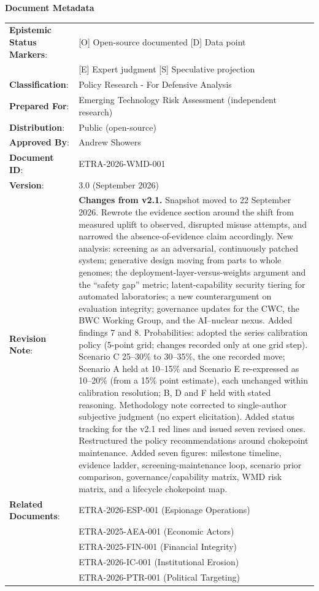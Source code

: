 \documentclass[11pt,letterpaper]{article}
\begin{document}
\vspace{0.1cm}

\begin{center}
\small\textbf{Document Metadata}

\vspace{0.5em}

\footnotesize
\begin{tabular}{ll}
\textbf{Epistemic Status Markers}: & [O] Open-source documented \textbar{} [D] Data point \\
& [E] Expert judgment \textbar{} [S] Speculative projection \\
\textbf{Classification}: & Policy Research - For Defensive Analysis \\
\textbf{Prepared For}: & Emerging Technology Risk Assessment (independent research) \\
\textbf{Distribution}: & Public (open-source) \\
\textbf{Approved By}: & Andrew Showers \\
\textbf{Document ID}: & ETRA-2026-WMD-001 \\
\textbf{Version}: & 3.0 (September 2026) \\
\textbf{Revision Note}: & \parbox[t]{11cm}{\raggedright \textbf{Changes from v2.1.} Snapshot moved to 22 September 2026. Rewrote the evidence section around the shift from measured uplift to observed, disrupted misuse attempts, and narrowed the absence-of-evidence claim accordingly. New analysis: screening as an adversarial, continuously patched system; generative design moving from parts to whole genomes; the deployment-layer-versus-weights argument and the ``safety gap'' metric; latent-capability security tiering for automated laboratories; a new counterargument on evaluation integrity; governance updates for the CWC, the BWC Working Group, and the AI--nuclear nexus. Added findings 7 and 8. Probabilities: adopted the series calibration policy (5-point grid; changes recorded only at one grid step). Scenario C 25--30\% to 30--35\%, the one recorded move; Scenario A held at 10--15\% and Scenario E re-expressed as 10--20\% (from a 15\% point estimate), each unchanged within calibration resolution; B, D and F held with stated reasoning. Methodology note corrected to single-author subjective judgment (no expert elicitation). Added status tracking for the v2.1 red lines and issued seven revised ones. Restructured the policy recommendations around chokepoint maintenance. Added seven figures: milestone timeline, evidence ladder, screening-maintenance loop, scenario prior comparison, governance/capability matrix, WMD risk matrix, and a lifecycle chokepoint map.} \\
\textbf{Related Documents}: & ETRA-2026-ESP-001 (Espionage Operations) \\
& ETRA-2025-AEA-001 (Economic Actors) \\
& ETRA-2025-FIN-001 (Financial Integrity) \\
& ETRA-2026-IC-001 (Institutional Erosion) \\
& ETRA-2026-PTR-001 (Political Targeting) \\
\end{tabular}
\end{center}
\end{document}
